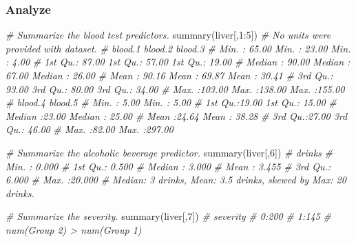 \documentclass[
  11pt,
  a4paper,
]{scrartcl}
\newenvironment{Shaded}{\begin{snugshade}}{\end{snugshade}}
\newcommand{\CommentTok}[1]{\textcolor[rgb]{0.56,0.35,0.01}{\textit{#1}}}
\newcommand{\DecValTok}[1]{\textcolor[rgb]{0.00,0.00,0.81}{#1}}
\newcommand{\FunctionTok}[1]{\textcolor[rgb]{0.00,0.00,0.00}{#1}}
\newcommand{\NormalTok}[1]{#1}
\newcommand{\SpecialCharTok}[1]{\textcolor[rgb]{0.00,0.00,0.00}{#1}}
\begin{document}
\hypertarget{analyze}{%
\subsubsection{Analyze}\label{analyze}}

\begin{Shaded}
\begin{Highlighting}[]
\CommentTok{\# Summarize the blood test predictors.}
\FunctionTok{summary}\NormalTok{(liver[,}\DecValTok{1}\SpecialCharTok{:}\DecValTok{5}\NormalTok{]) }\CommentTok{\# No units were provided with dataset.}
\CommentTok{\#     blood.1          blood.2          blood.3      }
\CommentTok{\#  Min.   : 65.00   Min.   : 23.00   Min.   :  4.00  }
\CommentTok{\#  1st Qu.: 87.00   1st Qu.: 57.00   1st Qu.: 19.00  }
\CommentTok{\#  Median : 90.00   Median : 67.00   Median : 26.00  }
\CommentTok{\#  Mean   : 90.16   Mean   : 69.87   Mean   : 30.41  }
\CommentTok{\#  3rd Qu.: 93.00   3rd Qu.: 80.00   3rd Qu.: 34.00  }
\CommentTok{\#  Max.   :103.00   Max.   :138.00   Max.   :155.00  }
\CommentTok{\#     blood.4         blood.5      }
\CommentTok{\#  Min.   : 5.00   Min.   :  5.00  }
\CommentTok{\#  1st Qu.:19.00   1st Qu.: 15.00  }
\CommentTok{\#  Median :23.00   Median : 25.00  }
\CommentTok{\#  Mean   :24.64   Mean   : 38.28  }
\CommentTok{\#  3rd Qu.:27.00   3rd Qu.: 46.00  }
\CommentTok{\#  Max.   :82.00   Max.   :297.00}
\end{Highlighting}
\end{Shaded}

\begin{Shaded}
\begin{Highlighting}[]
\CommentTok{\# Summarize the alcoholic beverage predictor.}
\FunctionTok{summary}\NormalTok{(liver[,}\DecValTok{6}\NormalTok{]) }
\CommentTok{\#      drinks      }
\CommentTok{\#  Min.   : 0.000  }
\CommentTok{\#  1st Qu.: 0.500  }
\CommentTok{\#  Median : 3.000  }
\CommentTok{\#  Mean   : 3.455  }
\CommentTok{\#  3rd Qu.: 6.000  }
\CommentTok{\#  Max.   :20.000}
\CommentTok{\# Median: 3 drinks, Mean: 3.5 drinks, skewed by Max: 20 drinks.}
\end{Highlighting}
\end{Shaded}

\begin{Shaded}
\begin{Highlighting}[]
\CommentTok{\# Summarize the severity.}
\FunctionTok{summary}\NormalTok{(liver[,}\DecValTok{7}\NormalTok{])}
\CommentTok{\#  severity}
\CommentTok{\#  0:200   }
\CommentTok{\#  1:145}
\CommentTok{\# num(Group 2) \textgreater{} num(Group 1)}
\end{Highlighting}
\end{Shaded}
\end{document}
